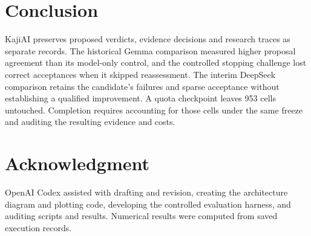 \documentclass[conference]{IEEEtran}
\begin{document}
\section{Conclusion}
KajiAI preserves proposed verdicts, evidence decisions and research traces as separate records. The historical Gemma comparison measured higher proposal agreement than its model-only control, and the controlled stopping challenge lost correct acceptances when it skipped reassessment. The interim DeepSeek comparison retains the candidate's failures and sparse acceptance without establishing a qualified improvement. A quota checkpoint leaves 953 cells untouched. Completion requires accounting for those cells under the same freeze and auditing the resulting evidence and costs.

\section*{Acknowledgment}
OpenAI Codex assisted with drafting and revision, creating the architecture diagram and plotting code, developing the controlled evaluation harness, and auditing scripts and results. Numerical results were computed from saved execution records.
\end{document}
